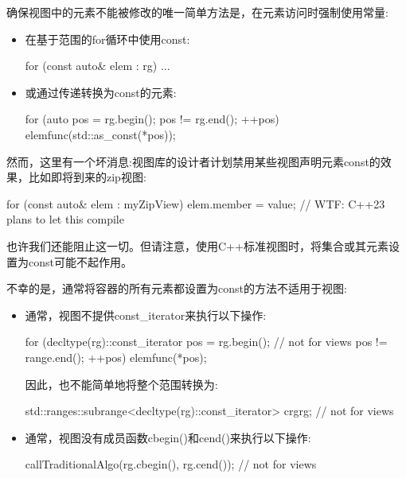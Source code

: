 
确保视图中的元素不能被修改的唯一简单方法是，在元素访问时强制使用常量:

\begin{itemize}
\item
在基于范围的for循环中使用const:

\begin{cpp}
for (const auto& elem : rg) {
	...
}
\end{cpp}

\item
或通过传递转换为const的元素:

\begin{cpp}
for (auto pos = rg.begin(); pos != rg.end(); ++pos) {
	elemfunc(std::as_const(*pos));
}
\end{cpp}
\end{itemize}

然而，这里有一个坏消息:视图库的设计者计划禁用某些视图声明元素const的效果，比如即将到来的zip视图:

\begin{cpp}
for (const auto& elem : myZipView) {
	elem.member = value; // WTF: C++23 plans to let this compile
}
\end{cpp}

也许我们还能阻止这一切。但请注意，使用C++标准视图时，将集合或其元素设置为const可能不起作用。


不幸的是，通常将容器的所有元素都设置为const的方法不适用于视图:

\begin{itemize}
\item
通常，视图不提供const\_iterator来执行以下操作:

\begin{cpp}
for (decltype(rg)::const_iterator pos = rg.begin(); // not for views
pos != range.end();
++pos) {
	elemfunc(*pos);
}
\end{cpp}

因此，也不能简单地将整个范围转换为:

\begin{cpp}
std::ranges::subrange<decltype(rg)::const_iterator> crg{rg}; // not for views
\end{cpp}

\item
通常，视图没有成员函数cbegin()和cend()来执行以下操作:

\begin{cpp}
callTraditionalAlgo(rg.cbegin(), rg.cend()); // not for views
\end{cpp}
\end{itemize}

